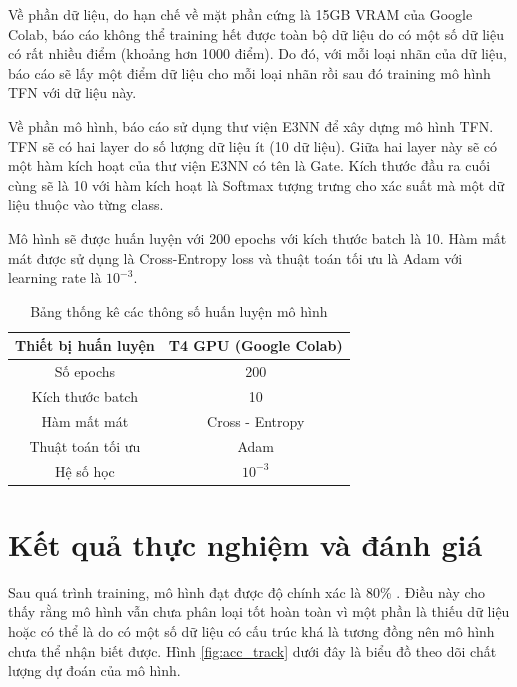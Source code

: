 Về phần dữ liệu, do hạn chế về mặt phần cứng là 15GB VRAM của Google Colab, báo cáo không thể training hết được toàn bộ dữ liệu do có một số dữ liệu có rất nhiều điểm (khoảng hơn 1000 điểm). Do đó, với mỗi loại nhãn của dữ liệu, báo cáo sẽ lấy một điểm dữ liệu cho mỗi loại nhãn rồi sau đó training mô hình TFN với dữ liệu này.

Về phần mô hình, báo cáo sử dụng thư viện E3NN để xây dựng mô hình TFN. TFN sẽ có hai layer do số lượng dữ liệu ít (10 dữ liệu). Giữa hai layer này sẽ có một hàm kích hoạt của thư viện E3NN có tên là Gate. Kích thước đầu ra cuối cùng sẽ là 10 với hàm kích hoạt là Softmax tượng trưng cho xác suất mà một dữ liệu thuộc vào từng class. 

Mô hình sẽ được huấn luyện với 200 epochs với kích thước batch là 10. Hàm mất mát được sử dụng là Cross-Entropy loss và thuật toán tối ưu là Adam với learning rate là $10^{-3}$.

\begin{table}[h!]
\centering
 \begin{tabular}{|c | c |} 
 \hline
    Thiết bị huấn luyện & T4 GPU (Google Colab)\\
 \hline
    Số epochs & 200\\
 \hline
    Kích thước batch & 10\\
 \hline
    Hàm mất mát & Cross - Entropy\\
 \hline
    Thuật toán tối ưu & Adam\\
 \hline
    Hệ số học & $10^{-3}$\\
 \hline
 \end{tabular}
 \caption{Bảng thống kê các thông số huấn luyện mô hình}
\end{table}

\section{Kết quả thực nghiệm và đánh giá}
Sau quá trình training, mô hình đạt được độ chính xác là 80\% . Điều này cho thấy rằng mô hình vẫn chưa phân loại tốt hoàn toàn vì một phần là thiếu dữ liệu hoặc có thể là do có một số dữ liệu có cấu trúc khá là tương đồng nên mô hình chưa thể nhận biết được. Hình \ref{fig:acc_track} dưới đây là biểu đồ theo dõi chất lượng dự đoán của mô hình.

